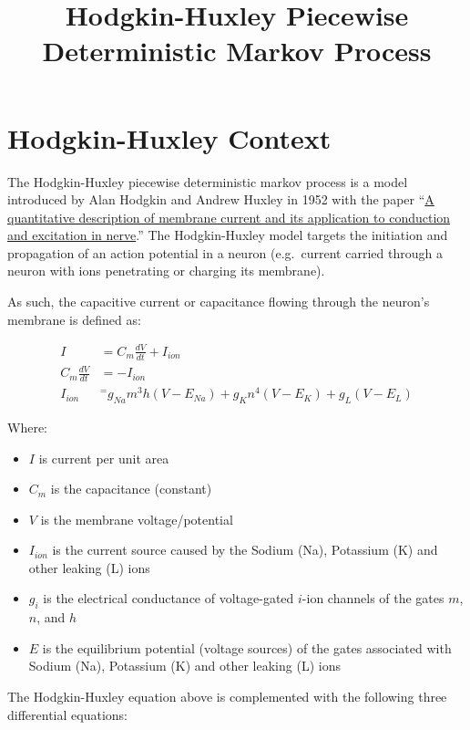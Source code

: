 \documentclass[
]{article}
\title{Hodgkin-Huxley Piecewise Deterministic Markov Process}
\author{}
\date{\vspace{-2.5em}}
\providecommand{\tightlist}{%
  \setlength{\itemsep}{0pt}\setlength{\parskip}{0pt}}
\begin{document}
\maketitle

\hypertarget{hodgkin-huxley-context}{%
\section{Hodgkin-Huxley Context}\label{hodgkin-huxley-context}}

The Hodgkin-Huxley piecewise deterministic markov process is a model
introduced by Alan Hodgkin and Andrew Huxley in 1952 with the paper
``\href{https://pubmed.ncbi.nlm.nih.gov/12991237/}{A quantitative
description of membrane current and its application to conduction and
excitation in nerve}.'' The Hodgkin-Huxley model targets the initiation
and propagation of an action potential in a neuron (e.g.~current carried
through a neuron with ions penetrating or charging its membrane).

As such, the capacitive current or capacitance flowing through the
neuron's membrane is defined as:

\begin{align}
I &= C_m\frac{dV}{dt} + I_{ion}\\
C_m\frac{dV}{dt} &=- I_{ion}\\
I_{ion} &^= g_{Na}m^3h(V-E_{Na}) + g_Kn^4(V-E_K)+g_L(V-E_L)
\end{align}

Where:

\begin{itemize}
\tightlist
\item
  \(I\) is current per unit area
\item
  \(C_m\) is the capacitance (constant)
\item
  \(V\) is the membrane voltage/potential
\item
  \(I_{ion}\) is the current source caused by the Sodium (Na), Potassium
  (K) and other leaking (L) ions
\item
  \(g_i\) is the electrical conductance of voltage-gated \(i\)-ion
  channels of the gates \(m\), \(n\), and \(h\)
\item
  \(E\) is the equilibrium potential (voltage sources) of the gates
  associated with Sodium (Na), Potassium (K) and other leaking (L) ions
\end{itemize}

The Hodgkin-Huxley equation above is complemented with the following
three differential equations:
\end{document}
